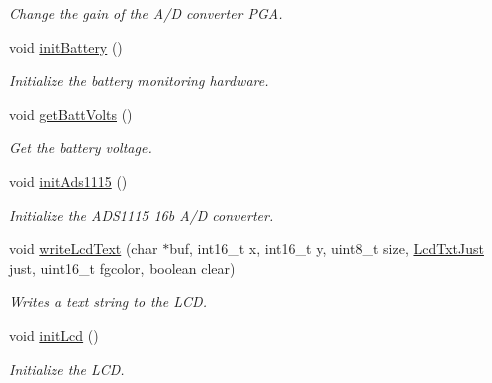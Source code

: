 \begin{DoxyCompactItemize}
\begin{DoxyCompactList}\small\item\em Change the gain of the A/\-D converter P\-G\-A. \end{DoxyCompactList}\item 
void \hyperlink{_milli_ohm_meter_8ino_af1cb6090825d3e387191264c221e898a}{init\-Battery} ()
\begin{DoxyCompactList}\small\item\em Initialize the battery monitoring hardware. \end{DoxyCompactList}\item 
void \hyperlink{_milli_ohm_meter_8ino_aa001cd2d4343cc0f50d664f0ae0899e4}{get\-Batt\-Volts} ()
\begin{DoxyCompactList}\small\item\em Get the battery voltage. \end{DoxyCompactList}\item 
void \hyperlink{_milli_ohm_meter_8ino_a03e334fd582a89ab2ebae6e3939489f5}{init\-Ads1115} ()
\begin{DoxyCompactList}\small\item\em Initialize the A\-D\-S1115 16b A/\-D converter. \end{DoxyCompactList}\item 
void \hyperlink{_milli_ohm_meter_8ino_a7722a7949ea0b9260e5ea6d47b1cb87f}{write\-Lcd\-Text} (char $\ast$buf, int16\-\_\-t x, int16\-\_\-t y, uint8\-\_\-t size, \hyperlink{_milli_ohm_meter_8h_a86946be575797b2acea8036d60addf04}{Lcd\-Txt\-Just} just, uint16\-\_\-t fgcolor, boolean clear)
\begin{DoxyCompactList}\small\item\em Writes a text string to the L\-C\-D. \end{DoxyCompactList}\item 
void \hyperlink{_milli_ohm_meter_8ino_ad6f84952daad8f46512a59ee823ac0a4}{init\-Lcd} ()
\begin{DoxyCompactList}\small\item\em Initialize the L\-C\-D. \end{DoxyCompactList}\end{DoxyCompactItemize}


